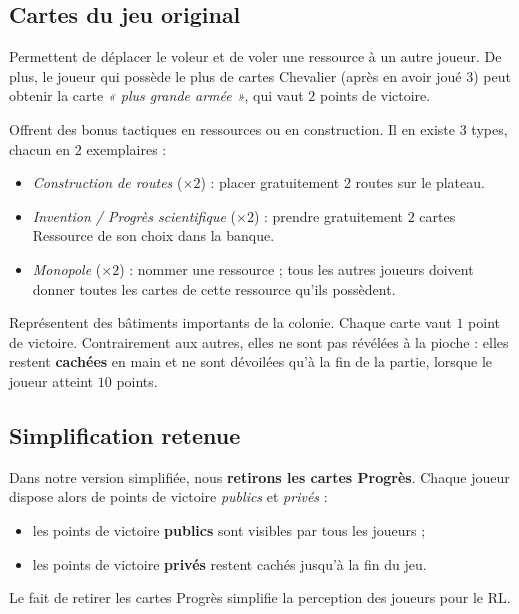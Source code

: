 \documentclass[11pt,a4paper]{article}
\begin{document}
\subsection{Cartes du jeu original}

\begin{description}[leftmargin=1.4cm, style=nextline]
  \item[Chevalier (14 cartes)] Permettent de déplacer le voleur et de voler une
    ressource à un autre joueur. De plus, le joueur qui possède le plus de cartes
    Chevalier (après en avoir joué $3$) peut obtenir la carte \emph{« plus grande
    armée »}, qui vaut $2$ points de victoire.
  \item[Progrès (6 cartes)] Offrent des bonus tactiques en ressources ou en
    construction. Il en existe $3$ types, chacun en $2$ exemplaires :
    \begin{itemize}[nosep]
      \item \emph{Construction de routes} ($\times 2$) : placer gratuitement
            $2$ routes sur le plateau.
      \item \emph{Invention / Progrès scientifique} ($\times 2$) : prendre
            gratuitement $2$ cartes Ressource de son choix dans la banque.
      \item \emph{Monopole} ($\times 2$) : nommer une ressource ; tous les autres
            joueurs doivent donner toutes les cartes de cette ressource qu'ils
            possèdent.
    \end{itemize}
  \item[Point de Victoire (5 cartes)] Représentent des bâtiments importants de la
    colonie. Chaque carte vaut $1$ point de victoire. Contrairement aux autres,
    elles ne sont pas révélées à la pioche : elles restent \textbf{cachées} en main
    et ne sont dévoilées qu'à la fin de la partie, lorsque le joueur atteint
    $10$ points.
\end{description}

\subsection{Simplification retenue}

\begin{remarque}
Dans notre version simplifiée, nous \textbf{retirons les cartes Progrès}. Chaque
joueur dispose alors de points de victoire \emph{publics} et \emph{privés} :
\begin{itemize}[nosep]
  \item les points de victoire \textbf{publics} sont visibles par tous les joueurs ;
  \item les points de victoire \textbf{privés} restent cachés jusqu'à la fin du jeu.
\end{itemize}
Le fait de retirer les cartes Progrès simplifie la perception des joueurs pour le RL.
\end{remarque}
\end{document}
